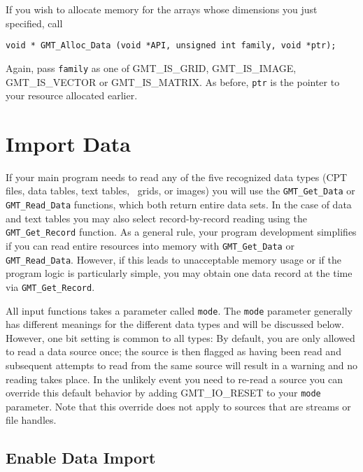 \documentclass[11pt]{report}
\begin{document}
If you wish to allocate memory for the arrays whose dimensions you just specified, call


\begin{verbatim}
void * GMT_Alloc_Data (void *API, unsigned int family, void *ptr);
\end{verbatim}
Again, pass \texttt{family} as one of GMT\_IS\_GRID, GMT\_IS\_IMAGE, GMT\_IS\_VECTOR or GMT\_IS\_MATRIX.
As before, \texttt{ptr} is the pointer to your resource allocated earlier.

\section{Import Data}

If your main program needs to read any of the five recognized data types (CPT files, data tables, text tables, \GMT\ grids, or images)
you will use the \texttt{GMT\_Get\_Data} or \texttt{GMT\_Read\_Data} functions, which both return entire data sets.
In the case of data and text tables you may also select record-by-record reading using the \texttt{GMT\_Get\_Record} function.
As a general rule, your program development simplifies if you can read entire resources into memory with
\texttt{GMT\_Get\_Data} or \texttt{GMT\_Read\_Data}.  However, if this leads to unacceptable memory usage or if the program logic is particularly simple,
you may obtain one data record at the time via \texttt{GMT\_Get\_Record}.

All input functions takes a parameter called \texttt{mode}.  The \texttt{mode} parameter generally
has different meanings for the different data types and will be discussed below.
However, one bit setting is common to all types: By default, you are only allowed to read a
data source once; the source is then flagged as having been read and subsequent attempts to read
from the same source will result in a warning and no reading takes place.  In the unlikely event you need to re-read a
source you can override this default behavior by adding GMT\_IO\_RESET to your \texttt{mode} parameter.
Note that this override does not apply to sources that are streams or file handles.

\subsection{Enable Data Import}
\end{document}
